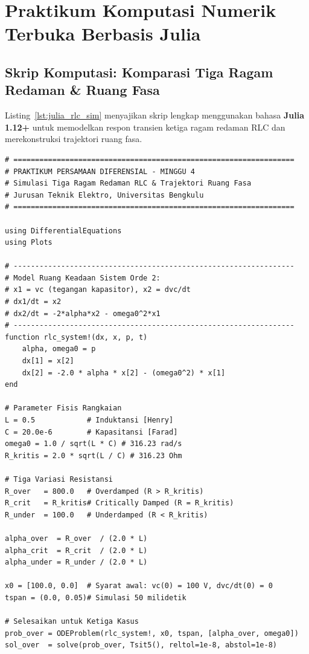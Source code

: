 \documentclass[11pt,a4paper]{article}
\theoremstyle{definition}
\begin{document}
\section{Praktikum Komputasi Numerik Terbuka Berbasis Julia}

\subsection{Skrip Komputasi: Komparasi Tiga Ragam Redaman \& Ruang Fasa}

Listing~\ref{lst:julia_rlc_sim} menyajikan skrip lengkap menggunakan bahasa \textbf{Julia 1.12+} untuk memodelkan respon transien ketiga ragam redaman RLC dan merekonstruksi trajektori ruang fasa.

\begin{lstlisting}[style=juliastyle, caption={Simulasi Tiga Ragam Redaman RLC dan Ruang Fasa dengan Julia.}, label={lst:julia_rlc_sim}]
# =================================================================
# PRAKTIKUM PERSAMAAN DIFERENSIAL - MINGGU 4
# Simulasi Tiga Ragam Redaman RLC & Trajektori Ruang Fasa
# Jurusan Teknik Elektro, Universitas Bengkulu
# =================================================================

using DifferentialEquations
using Plots

# -----------------------------------------------------------------
# Model Ruang Keadaan Sistem Orde 2:
# x1 = vc (tegangan kapasitor), x2 = dvc/dt
# dx1/dt = x2
# dx2/dt = -2*alpha*x2 - omega0^2*x1
# -----------------------------------------------------------------
function rlc_system!(dx, x, p, t)
    alpha, omega0 = p
    dx[1] = x[2]
    dx[2] = -2.0 * alpha * x[2] - (omega0^2) * x[1]
end

# Parameter Fisis Rangkaian
L = 0.5            # Induktansi [Henry]
C = 20.0e-6        # Kapasitansi [Farad]
omega0 = 1.0 / sqrt(L * C) # 316.23 rad/s
R_kritis = 2.0 * sqrt(L / C) # 316.23 Ohm

# Tiga Variasi Resistansi
R_over   = 800.0   # Overdamped (R > R_kritis)
R_crit   = R_kritis# Critically Damped (R = R_kritis)
R_under  = 100.0   # Underdamped (R < R_kritis)

alpha_over  = R_over  / (2.0 * L)
alpha_crit  = R_crit  / (2.0 * L)
alpha_under = R_under / (2.0 * L)

x0 = [100.0, 0.0]  # Syarat awal: vc(0) = 100 V, dvc/dt(0) = 0
tspan = (0.0, 0.05)# Simulasi 50 milidetik

# Selesaikan untuk Ketiga Kasus
prob_over = ODEProblem(rlc_system!, x0, tspan, [alpha_over, omega0])
sol_over  = solve(prob_over, Tsit5(), reltol=1e-8, abstol=1e-8)


\end{lstlisting}
\end{document}
